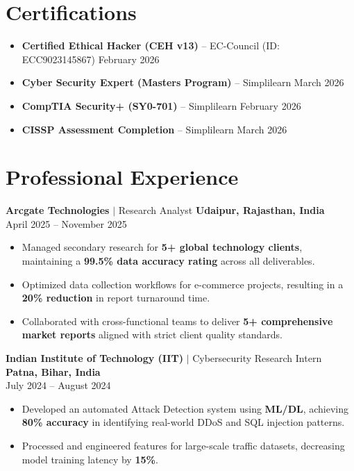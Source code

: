 \documentclass[10pt,a4paper,sans]{article}
\begin{document}
\section{Certifications}
\begin{itemize}
    \item \textbf{Certified Ethical Hacker (CEH v13)} -- EC-Council (ID: ECC9023145867) \hfill February 2026
    \item \textbf{Cyber Security Expert (Masters Program)} -- Simplilearn \hfill March 2026
    \item \textbf{CompTIA Security+ (SY0-701)} -- Simplilearn \hfill February 2026
    \item \textbf{CISSP Assessment Completion} -- Simplilearn \hfill March 2026
\end{itemize}

\section{Professional Experience}
\noindent \textbf{Arcgate Technologies} $|$ {Research Analyst} \hfill \textbf{Udaipur, Rajasthan, India} \\
{April 2025 -- November 2025}
\begin{itemize}
    \item Managed secondary research for \textbf{5+ global technology clients}, maintaining a \textbf{99.5\% data accuracy rating} across all deliverables.
    \item Optimized data collection workflows for e-commerce projects, resulting in a \textbf{20\% reduction} in report turnaround time.
    \item Collaborated with cross-functional teams to deliver \textbf{5+ comprehensive market reports} aligned with strict client quality standards.
\end{itemize}

\noindent \textbf{Indian Institute of Technology (IIT)} $|$ {Cybersecurity Research Intern} \hfill \textbf{Patna, Bihar, India} \\
{July 2024 -- August 2024}
\begin{itemize}
    \item Developed an automated Attack Detection system using \textbf{ML/DL}, achieving \textbf{80\% accuracy} in identifying real-world DDoS and SQL injection patterns.
    \item Processed and engineered features for large-scale traffic datasets, decreasing model training latency by \textbf{15\%}.
\end{itemize}
\end{document}

